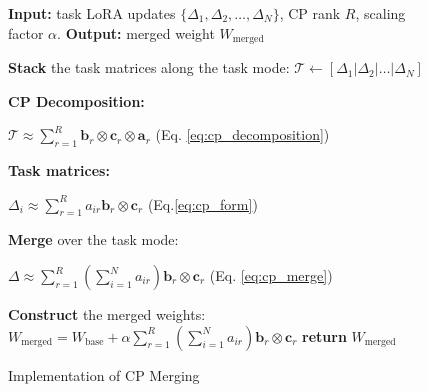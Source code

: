 \begin{figure}
\vspace{-20pt} 
  \centering
  \begin{minipage}{0.48\textwidth}
    \begin{algorithm}[H]
        \caption{Implementation of CP Merging}
        \begin{algorithmic}[1] %
            \STATE \textbf{Input:} task LoRA updates $\{\Delta_{1},\Delta_{2},\ldots, \Delta_{N}\}$, CP rank $R$, scaling factor $\alpha$.
            \STATE \textbf{Output:} merged weight $W_{\text{merged}}$
            


            \STATE \textbf{Stack} the task matrices along the task mode: \STATE $\mathcal{T}\leftarrow
            [\Delta_{1}|\Delta_{2}|\ldots|\Delta_{N}]$

            \STATE \textbf{CP Decomposition:}

            \STATE
            $\mathcal{T}\approx \sum_{r=1}^{R}\mathbf{b}_{r}\otimes \mathbf{c}_{r}
            \otimes \mathbf{a}_{r}$
            (Eq. \ref{eq:cp_decomposition})

            \STATE \textbf{Task matrices:}

            \STATE
            $\Delta_{i}\approx \sum_{r=1}^{R}a_{ir}\textbf{b}_{r}\otimes \textbf{
             c}_{r}$
            \quad\quad (Eq.\ref{eq:cp_form})

            \STATE \textbf{Merge} over the task mode:

            \STATE $\Delta \approx \sum_{r=1}^{R}\left( \sum_{i=1}^{N}a_{ir}\right
            ) \textbf{b}_{r}\otimes \textbf{c}_{r}$ \quad (Eq.
            \ref{eq:cp_merge})

            \STATE \textbf{Construct} the merged weights: \STATE
            $W_{\mathrm{merged}}=W_{\text{base}}+\alpha\sum_{r=1}^{R}\left( \sum_{i=1}^{N}a_{ir}\right
            ) \textbf{b}_{r}\otimes \textbf{c}_{r}$
            \STATE \textbf{return} $W_{\text{merged}}$
        \end{algorithmic}
        \label{al:factorizing}
    \end{algorithm}
\end{minipage}
\end{figure}